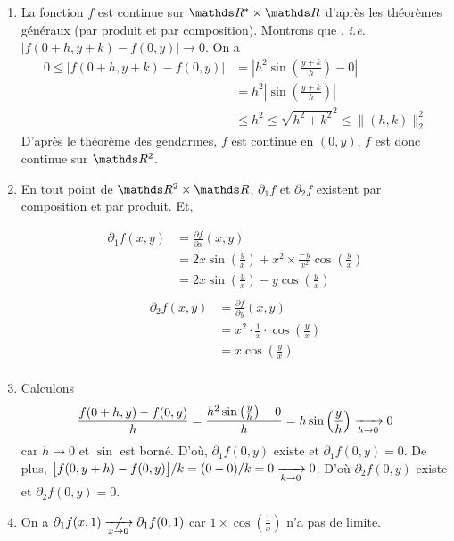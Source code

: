 \begin{exo}
	\begin{enumerate}
		\item La fonction $f$ est continue sur $\R^* \times \R$ d'après les théorèmes généraux (par produit et par composition).
			Montrons que , \textit{i.e.}\ $|f(0+h,y+k) - f(0,y)| \to 0$.
			On a
			\begin{align*}
				0 \le |f(0+h,y+k) - f(0,y)| &= \left|h^2 \sin \left( \frac{y + k}{h} \right) - 0 \right|\\
				&= h^2 \left| \sin\left( \frac{y+k}{h} \right) \right| \\
				&\le h^2 \le \sqrt{h^2 + k^2}^2 \le \|(h,k)\|^2_2
			\end{align*}
			D'après le théorème des gendarmes, $f$ est continue en $(0, y)$, $f$ est donc continue sur $\R^2$.
		\item En tout point de $\R^2 \times \R$, $\partial_1 f$ et $\partial_2 f$ existent par composition et par produit. Et,
			\begin{multicols}{2}
				\begin{align*}
					\partial_1f(x,y) &= \frac{\partial f}{\partial x}(x,y) \\
					&= 2x \sin\left( \frac{y}{x} \right) + x^2 \times \frac{-y}{x^2} \cos \left( \frac{y}{x} \right) \\
					&= 2x \sin\left( \frac{y}{x} \right) - y \cos\left( \frac{y}{x} \right) \\
				\end{align*}
				\begin{align*}
					\partial_2 f(x,y) &= \frac{\partial f}{\partial y}(x,y) \\
					&= x^2 \cdot \frac{1}{x} \cdot \cos\left( \frac{y}{x} \right) \\
					&= x \cos\left( \frac{y}{x} \right) \\
				\end{align*}
			\end{multicols}
		\item Calculons
			\[
				\frac{f(0+h,y) - f(0,y)}{h} = \frac{h^2 \sin\left( \frac{y}{h} \right) - 0}{h} = h \sin\left( \frac{y}{h} \right) \xrightarrow[h\to 0]{} 0
			\] car $h \to 0$ et $\sin$ est borné.
			D'où, $\partial_1 f(0,y)$ existe et $\partial_1 f(0,y) = 0$.
			De plus, $\big[f(0,y+h) - f(0,y)\big] / k = (0-0) / k = 0 \xrightarrow[k\to 0]{} 0$. D'où $\partial_2 f(0,y)$ existe et $\partial_2f(0,y) = 0$.
		\item On a $\partial_1 f(x,1) \centernot{\tendsto{x\to 0}} \partial_1 f(0, 1)$ car $1 \times \cos \left( \frac{1}{x} \right)$ n'a pas de limite.
	\end{enumerate}
\end{exo}

